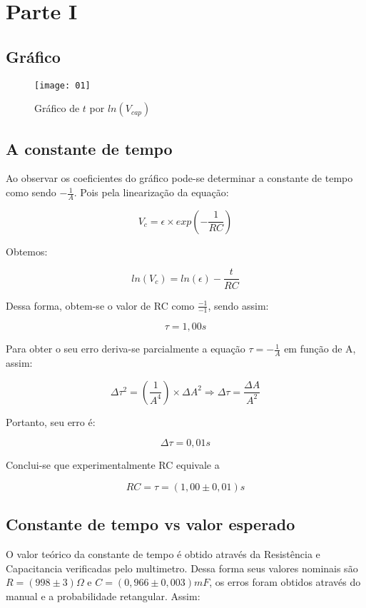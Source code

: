 \section{Parte I}
    \subsection{Gráfico}
        \begin{figure} [H] 
            \texttt{[image: 01]}
            \caption{Gráfico de $t$ por $ln(V_{cap})$}
            \label{fig:01}
        \end{figure}
    \subsection{A constante de tempo}
       
        Ao observar os coeficientes do gráfico pode-se determinar a 
        constante de tempo como sendo $-\frac{1}{A}$. 
        Pois pela linearização da equação:

        $$V_c = \epsilon \times exp(-\frac{1}{RC})$$

        Obtemos:

        $$ln(V_c) = ln(\epsilon) - \frac{t}{RC}$$

        Dessa forma, obtem-se o valor de RC como $\frac{-1}{-1}$, sendo assim:
        
        $$\tau = 1,00s$$

        Para obter o seu erro deriva-se parcialmente a equação $\tau = -\frac{1}{A}$
        em função de A, assim: 

        $$\Delta\tau^2 = (\frac{1}{A^4})\times\Delta A^2 
        \Rightarrow \Delta\tau = \frac{\Delta A}{A^2}$$

        Portanto, seu erro é: 
        
        $$\Delta\tau = 0,01s$$
        
        Conclui-se que experimentalmente RC equivale a 
        
        $$RC = \tau = (1,00 \pm 0,01)s$$

    \subsection{Constante de tempo vs valor esperado}
        
        O valor teórico da constante de tempo é obtido através da 
        Resistência e Capacitancia verificadas pelo multimetro.
        Dessa forma seus valores nominais são $R = (998 \pm 3)\Omega$ 
        e $C = (0,966 \pm 0,003)mF$, os erros foram obtidos através 
        do manual e a probabilidade retangular. Assim:
        
